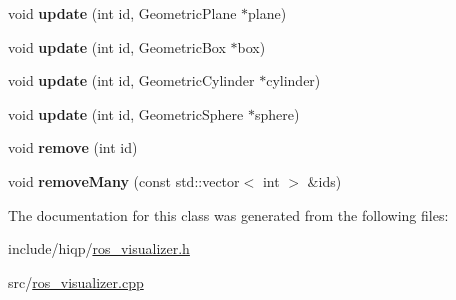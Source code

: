 \begin{DoxyCompactItemize}
\item 
\hypertarget{classhiqp_1_1ROSVisualizer_a2bd65ada4695ff3f8c3a10c6933443bf}{void {\bfseries update} (int id, Geometric\-Plane $\ast$plane)}\label{classhiqp_1_1ROSVisualizer_a2bd65ada4695ff3f8c3a10c6933443bf}

\item 
\hypertarget{classhiqp_1_1ROSVisualizer_a5c08aa488a28bc7661f042b1ec5120c1}{void {\bfseries update} (int id, Geometric\-Box $\ast$box)}\label{classhiqp_1_1ROSVisualizer_a5c08aa488a28bc7661f042b1ec5120c1}

\item 
\hypertarget{classhiqp_1_1ROSVisualizer_a004e1e446200c1d006c04b8417d6db00}{void {\bfseries update} (int id, Geometric\-Cylinder $\ast$cylinder)}\label{classhiqp_1_1ROSVisualizer_a004e1e446200c1d006c04b8417d6db00}

\item 
\hypertarget{classhiqp_1_1ROSVisualizer_ae27ff3c9c44a2e0cffe068b6cbde3a88}{void {\bfseries update} (int id, Geometric\-Sphere $\ast$sphere)}\label{classhiqp_1_1ROSVisualizer_ae27ff3c9c44a2e0cffe068b6cbde3a88}

\item 
\hypertarget{classhiqp_1_1ROSVisualizer_acfd8f9c92e114cee0c8207255b7126e7}{void {\bfseries remove} (int id)}\label{classhiqp_1_1ROSVisualizer_acfd8f9c92e114cee0c8207255b7126e7}

\item 
\hypertarget{classhiqp_1_1ROSVisualizer_a180827433d3c547c9d8afabb95694c5d}{void {\bfseries remove\-Many} (const std\-::vector$<$ int $>$ \&ids)}\label{classhiqp_1_1ROSVisualizer_a180827433d3c547c9d8afabb95694c5d}

\end{DoxyCompactItemize}


The documentation for this class was generated from the following files\-:\begin{DoxyCompactItemize}
\item 
include/hiqp/\hyperlink{ros__visualizer_8h}{ros\-\_\-visualizer.\-h}\item 
src/\hyperlink{ros__visualizer_8cpp}{ros\-\_\-visualizer.\-cpp}\end{DoxyCompactItemize}
